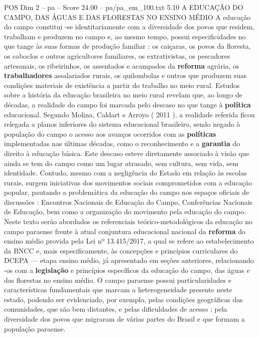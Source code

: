 \begin{textsample}{POS Dim 2 – pa – Score 24.00 – pa/pa\_em\_100.txt}  \label{ex:f2_pos_069}
5.10 A EDUCAÇÃO DO CAMPO, DAS ÁGUAS E DAS FLORESTAS NO ENSINO MÉDIO A educação do campo constitui -se identitariamente com a diversidade dos povos que residem, trabalham e produzem no campo e, ao mesmo tempo, possui especificidades no que tange às suas formas de produção familiar : os caiçaras, os povos da floresta, os caboclos e outros agricultores familiares, os extrativistas, os pescadores artesanais, os ribeirinhos, os assentados e acampados da \textbf{reforma} agrária, os \textbf{trabalhadores} assalariados rurais, os quilombolas e outros que produzem suas condições materiais de existência a partir do trabalho no meio rural.
Estudos sobre a história da educação brasileira no meio rural revelam que, ao longo de décadas, a realidade do campo foi marcada pelo descaso no que tange à \textbf{política} educacional.
Segundo Molina, Caldart e Arroyo ( 2011 ), a realidade referida ficou relegada a planos inferiores do sistema educacional brasileiro, sendo negado à população do campo o acesso aos avanços ocorridos com as \textbf{políticas} implementadas nas últimas décadas, como o reconhecimento e a \textbf{garantia} do direito à educação básica.
Este descaso esteve diretamente associado à visão que ainda se tem do campo como um lugar atrasado, sem cultura, sem vida, sem identidade.
Contudo, mesmo com a negligência do Estado em relação às escolas rurais, surgem iniciativas dos movimentos sociais comprometidos com a educação popular, pautando a problemática da educação do campo nos espaços oficiais de discussões : Encontros Nacionais de Educação do Campo, Conferências Nacionais de Educação, bem como a organização do movimento pela educação do campo.
Neste texto serão abordados os referenciais teórico-metodológicos da educação no campo paraense frente à atual conjuntura educacional nacional da \textbf{reforma} do ensino médio provida pela Lei nº 13.415/2017, a qual se refere ao estabelecimento da BNCC e, mais especificamente, às concepções e princípios curriculares do DCEPA — etapa ensino médio, já apresentado em seções anteriores, relacionando -os com a \textbf{legislação} e princípios específicos da educação do campo, das águas e das florestas no ensino médio.
O campo paraense possui particularidades e características fundamentais que marcam a heterogeneidade presente neste estado, podendo ser evidenciado, por exemplo, pelas condições geográficas das comunidades, que são bem distantes, e pelas dificuldades de acesso ; pela diversidade dos povos que migraram de várias partes do Brasil e que formam a população paraense.

\end{textsample}
